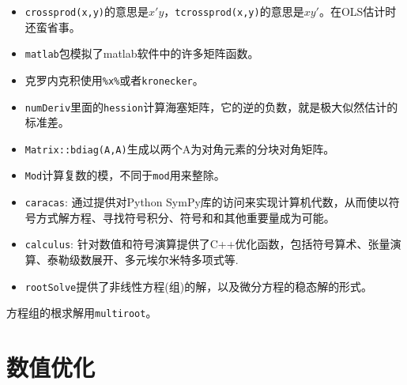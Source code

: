 \documentclass[
]{book}
\newenvironment{Shaded}{\begin{snugshade}}{\end{snugshade}}
\newcommand{\CommentTok}[1]{\textcolor[rgb]{0.56,0.35,0.01}{\textit{#1}}}
\newcommand{\ControlFlowTok}[1]{\textcolor[rgb]{0.13,0.29,0.53}{\textbf{#1}}}
\newcommand{\DataTypeTok}[1]{\textcolor[rgb]{0.13,0.29,0.53}{#1}}
\newcommand{\DecValTok}[1]{\textcolor[rgb]{0.00,0.00,0.81}{#1}}
\newcommand{\KeywordTok}[1]{\textcolor[rgb]{0.13,0.29,0.53}{\textbf{#1}}}
\newcommand{\NormalTok}[1]{#1}
\newcommand{\OperatorTok}[1]{\textcolor[rgb]{0.81,0.36,0.00}{\textbf{#1}}}
\newcommand{\StringTok}[1]{\textcolor[rgb]{0.31,0.60,0.02}{#1}}
\providecommand{\tightlist}{%
  \setlength{\itemsep}{0pt}\setlength{\parskip}{0pt}}
\begin{document}
\begin{itemize}
\tightlist
\item
  \texttt{crossprod(x,y)}的意思是\(x'y\)，\texttt{tcrossprod(x,y)}的意思是\(xy'\)。在OLS估计时还蛮省事。
\item
  \texttt{matlab}包模拟了matlab软件中的许多矩阵函数。
\item
  克罗内克积使用\texttt{\%x\%}或者\texttt{kronecker}。
\item
  \texttt{numDeriv}里面的\texttt{hession}计算海塞矩阵，它的逆的负数，就是极大似然估计的标准差。
\item
  \texttt{Matrix::bdiag(A,A)}生成以两个A为对角元素的分块对角矩阵。
\item
  \texttt{Mod}计算复数的模，不同于\texttt{mod}用来整除。
\item
  \texttt{caracas}: 通过提供对Python SymPy库的访问来实现计算机代数，从而使以符号方式解方程、寻找符号积分、符号和和其他重要量成为可能。
\item
  \texttt{calculus}: 针对数值和符号演算提供了C++优化函数，包括符号算术、张量演算、泰勒级数展开、多元埃尔米特多项式等.
\item
  \texttt{rootSolve}提供了非线性方程(组)的解，以及微分方程的稳态解的形式。
\end{itemize}

\begin{Shaded}
\end{Shaded}

方程组的根求解用\texttt{multiroot}。

\hypertarget{ux6570ux503cux4f18ux5316}{%
\section{数值优化}\label{ux6570ux503cux4f18ux5316}}
\end{document}
